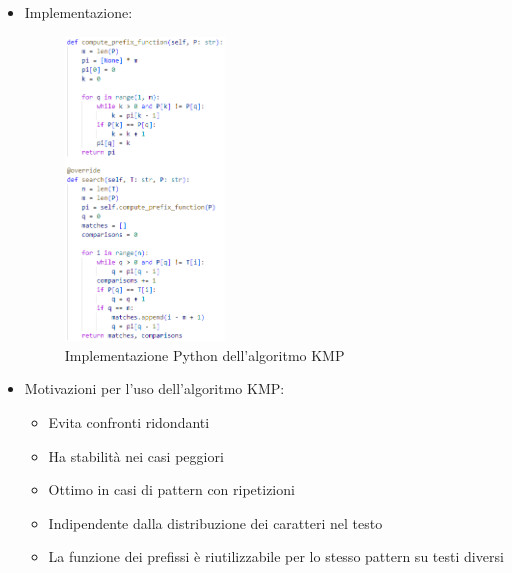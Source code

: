 \documentclass{article}
\begin{document}
\begin{itemize}
\begin{enumerate}[label=\arabic*b.]
          \end{enumerate}
    \item Implementazione:
          \begin{figure}[H]
              \centering
              \includegraphics[width=0.4\textwidth]{img/KMP_search.png}
              \caption{Implementazione Python dell'algoritmo KMP}
              \label{fig:KMP-implementation}
          \end{figure}
    \item Motivazioni per l'uso dell'algoritmo KMP:
          \begin{itemize}
              \item Evita confronti ridondanti
              \item Ha stabilità nei casi peggiori
              \item Ottimo in casi di pattern con ripetizioni
              \item Indipendente dalla distribuzione dei caratteri nel testo
              \item La funzione dei prefissi è riutilizzabile per lo stesso pattern su testi diversi
          \end{itemize}
\end{itemize}
\end{document}
